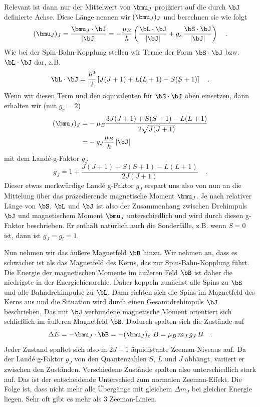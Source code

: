 Relevant ist dann nur der Mittelwert von  $\bmu_J $ projiziert auf die durch $\bJ$ definierte Achse.  Diese Länge nennen wir $(\bmu_J)_J$ und berechnen sie wie folgt
\begin{equation}
    (\bmu_J)_J = \frac{\bmu_J \cdot \bJ}{|\bJ|}
    = - \frac{\mu_B}{\hbar} \left(
        \frac{\bL \cdot \bJ}{|\bJ|}
        +  g_s \,\frac{\bS \cdot \bJ}{|\bJ|}
    \right)  \quad .
\end{equation}
Wie bei der Spin-Bahn-Kopplung stellen wir Terme der Form $\bS \cdot \bJ$ bzw. $\bL \cdot \bJ$  dar, z.B.
\begin{equation}
    \bL \cdot \bJ = \frac{\hbar^2}{2}
    \left[
  J (J+1) + L(L+1) - S(S+1)
    \right]  \quad .
\end{equation}
Wenn wir diesen Term und den äquivalenten für  $\bS \cdot \bJ$  oben einsetzen, dann erhalten wir (mit $g_s = 2$)
\begin{align}
    (\bmu_J)_J = & - \mu_B \frac{3 J (J+1)+ S(S+1) - L(L+1)}{2 \sqrt{J (J+1)}} \\
    = & - g_J \frac{\mu_B}{\hbar} \, |\bJ|
\end{align}
mit dem Landé-g-Faktor $g_J$ 
\begin{equation}
    g_J = 1 + \frac{J (J+1)+ S(S+1) - L(L+1)}{2 J (J+1)}   \quad .
\end{equation}
Dieser etwas merkwürdige Landé g-Faktor $g_J$ erspart uns also von nun an die Mittelung über das präzedierende magnetische Moment $\bmu_J$. Je nach relativer Länge von $\bS$, $\bL$ und $\bJ$ ist also der Zusammenhang zwischen Drehimpuls $\bJ$ und magnetischem Moment $\bmu_J$ unterschiedlich und wird durch diesen g-Faktor beschrieben. Er enthält natürlich auch die Sonderfälle, z.B. wenn $S=0$ ist, dann ist $g_J = g_l = 1$.





Nun nehmen wir das äußere Magnetfeld $\bB$ hinzu. Wir nehmen an, dass es schwächer ist als das Magnetfeld des Kerns, das zur Spin-Bahn-Kopplung führt. Die Energie der magnetischen Momente im äußeren Feld $\bB$ ist daher die niedrigste in der Energiehierarchie. Daher koppeln zunächst alle Spins zu $\bS$ und alle Bahndrehimpulse zu $\bL$. Dann richten sich die Spins im Magnetfeld des Kerns aus und die Situation wird durch einen Gesamtdrehimpuls $\bJ$ beschrieben. Das mit $\bJ$ verbundene magnetische Moment orientiert sich schließlich im äußeren Magnetfeld $\bB$. Dadurch spalten sich die Zustände  auf
\begin{equation}
    \Delta E = - \bmu_J \cdot \bB =-  (\bmu_J)_z  \, \, B =  \mu_B \, m_J \, g_J \, B  \quad .
\end{equation}
Jeder Zustand spaltet sich also in $2J+1$ äquidistante Zeeman-Niveaus auf. Da der Landé g-Faktor $g_J$ von den Quantenzahlen $S$, $L$ und $J$ abhängt, variiert er zwischen den Zuständen. Verschiedene Zustände spalten also unterschiedlich stark auf. Das ist der entscheidende Unterschied zum normalen Zeeman-Effekt. Die Folge ist, dass nicht mehr alle Übergänge mit gleichem $\Delta m_J$ bei gleicher Energie liegen. Sehr oft gibt es mehr als 3 Zeeman-Linien. 

